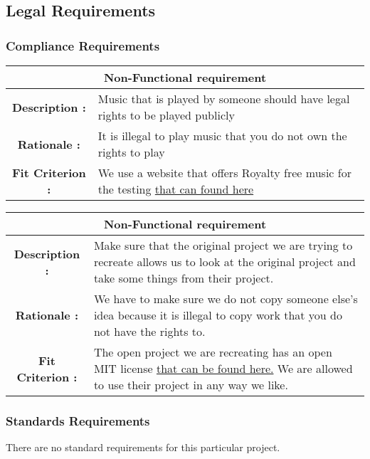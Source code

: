 \documentclass[12pt, titlepage]{article}
\begin{document}
\subsection{Legal Requirements}
\subsubsection{Compliance Requirements}

\begin{center}
\begin{table}[H]
\begin{tabularx}{\textwidth}{| c X |}
\hline
\multicolumn{2}{|c|}{\textbf{Non-Functional requirement}}\\
\hline
\textbf{Description : } &  Music that is played by someone should have legal rights to be played publicly \\
\hline
\textbf{Rationale : } & It is illegal to play music that you do not own the rights to play \\
\hline
\textbf{Fit Criterion : } & We use a website that offers Royalty free music for the testing \href{http://www.bensound.com/}{that can found here} \\
\hline
\end{tabularx}
\end{table}
\end{center}

\begin{center}
\begin{table} [H]
\begin{tabularx}{\textwidth}{| c X |}
\hline
\multicolumn{2}{|c|}{\textbf{Non-Functional requirement}}\\
\hline
\textbf{Description : } & Make sure that the original project we are trying to recreate allows us to look at the original project and take some things from their project. \\
\hline
\textbf{Rationale : } & We have to make sure we do not copy someone else's idea because it is illegal to copy work that you do not have the rights to. \\
\hline
\textbf{Fit Criterion : } & The open project we are recreating has an open MIT license \href{LICENSE.txt} {that can be found here.} We are allowed to use their project in any way we like.\\
\hline
\end{tabularx}
\end{table}
\end{center}

\subsubsection{Standards Requirements}
There are no standard requirements for this particular project.
\end{document}
